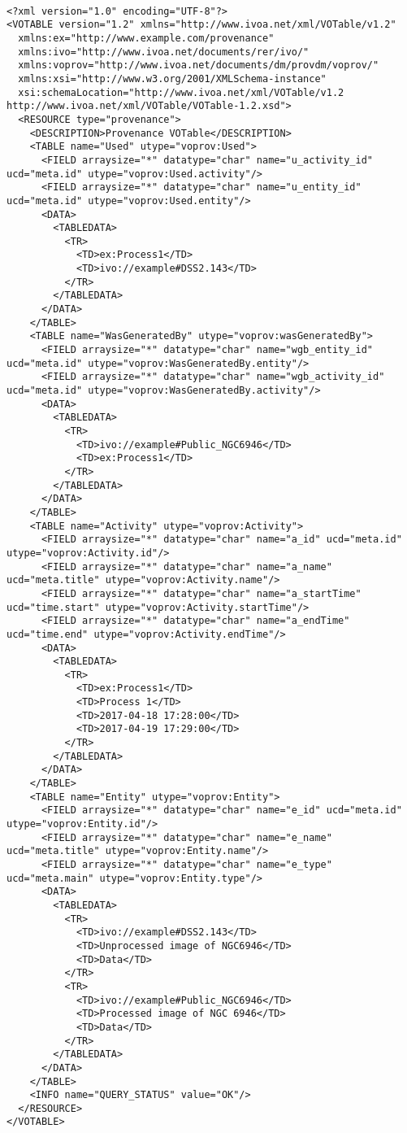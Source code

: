\begin{verbatim}

<?xml version="1.0" encoding="UTF-8"?>
<VOTABLE version="1.2" xmlns="http://www.ivoa.net/xml/VOTable/v1.2" 
  xmlns:ex="http://www.example.com/provenance" 
  xmlns:ivo="http://www.ivoa.net/documents/rer/ivo/"
  xmlns:voprov="http://www.ivoa.net/documents/dm/provdm/voprov/" 
  xmlns:xsi="http://www.w3.org/2001/XMLSchema-instance" 
  xsi:schemaLocation="http://www.ivoa.net/xml/VOTable/v1.2 http://www.ivoa.net/xml/VOTable/VOTable-1.2.xsd">
  <RESOURCE type="provenance">
    <DESCRIPTION>Provenance VOTable</DESCRIPTION>
    <TABLE name="Used" utype="voprov:Used">
      <FIELD arraysize="*" datatype="char" name="u_activity_id" ucd="meta.id" utype="voprov:Used.activity"/>
      <FIELD arraysize="*" datatype="char" name="u_entity_id" ucd="meta.id" utype="voprov:Used.entity"/>
      <DATA>
        <TABLEDATA>
          <TR>
            <TD>ex:Process1</TD>
            <TD>ivo://example#DSS2.143</TD>
          </TR>
        </TABLEDATA>
      </DATA>
    </TABLE>
    <TABLE name="WasGeneratedBy" utype="voprov:wasGeneratedBy">
      <FIELD arraysize="*" datatype="char" name="wgb_entity_id" ucd="meta.id" utype="voprov:WasGeneratedBy.entity"/>
      <FIELD arraysize="*" datatype="char" name="wgb_activity_id" ucd="meta.id" utype="voprov:WasGeneratedBy.activity"/>
      <DATA>
        <TABLEDATA>
          <TR>
            <TD>ivo://example#Public_NGC6946</TD>
            <TD>ex:Process1</TD>
          </TR>
        </TABLEDATA>
      </DATA>
    </TABLE>
    <TABLE name="Activity" utype="voprov:Activity">
      <FIELD arraysize="*" datatype="char" name="a_id" ucd="meta.id" utype="voprov:Activity.id"/>
      <FIELD arraysize="*" datatype="char" name="a_name" ucd="meta.title" utype="voprov:Activity.name"/>
      <FIELD arraysize="*" datatype="char" name="a_startTime" ucd="time.start" utype="voprov:Activity.startTime"/>
      <FIELD arraysize="*" datatype="char" name="a_endTime" ucd="time.end" utype="voprov:Activity.endTime"/>
      <DATA>
        <TABLEDATA>
          <TR>
            <TD>ex:Process1</TD>
            <TD>Process 1</TD>
            <TD>2017-04-18 17:28:00</TD>
            <TD>2017-04-19 17:29:00</TD>
          </TR>
        </TABLEDATA>
      </DATA>
    </TABLE>
    <TABLE name="Entity" utype="voprov:Entity">
      <FIELD arraysize="*" datatype="char" name="e_id" ucd="meta.id" utype="voprov:Entity.id"/>
      <FIELD arraysize="*" datatype="char" name="e_name" ucd="meta.title" utype="voprov:Entity.name"/>
      <FIELD arraysize="*" datatype="char" name="e_type" ucd="meta.main" utype="voprov:Entity.type"/>
      <DATA>
        <TABLEDATA>
          <TR>
            <TD>ivo://example#DSS2.143</TD>
            <TD>Unprocessed image of NGC6946</TD>
            <TD>Data</TD>
          </TR>
          <TR>
            <TD>ivo://example#Public_NGC6946</TD>
            <TD>Processed image of NGC 6946</TD>
            <TD>Data</TD>
          </TR>
        </TABLEDATA>
      </DATA>
    </TABLE>
    <INFO name="QUERY_STATUS" value="OK"/>
  </RESOURCE>
</VOTABLE>
\end{verbatim}

